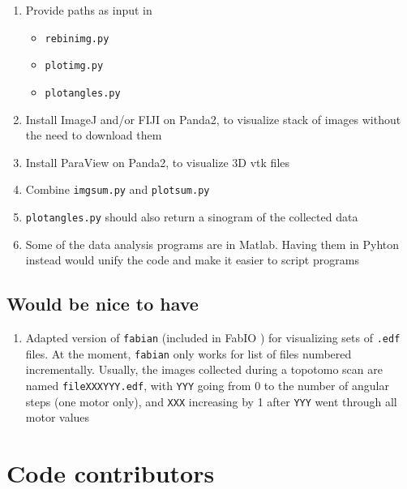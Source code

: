 \documentclass[11pt]{scrartcl}
\begin{document}
\begin{enumerate}
    \item Provide paths as input in
    \begin{itemize}
        \item {\texttt{rebin\textunderscore img.py}}
        \item {\texttt{plot\textunderscore img.py}}
        \item {\texttt{plot\textunderscore angles.py}}
    \end{itemize}
    \item Install ImageJ and/or {\footnotesize{FIJI}} on Panda2, to visualize stack of images without the need to download them
    \item Install ParaView on Panda2, to visualize {\footnotesize{3D}} vtk files
    \item Combine {\texttt{img\textunderscore sum.py}} and {\texttt{plot\textunderscore sum.py}}
    \item {\texttt{plot\textunderscore angles.py}} should also return a sinogram of the collected data
    \item Some of the data analysis programs are in Matlab. Having them in Pyhton instead would unify the code and make it easier to script programs
\end{enumerate}

\subsection{Would be nice to have}

\begin{enumerate}
    \item Adapted version of {\texttt{fabian}} (included in FabIO \cite{knudsen2013fabio}) for visualizing sets of {\texttt{.edf}} files. At the moment, {\texttt{fabian}} only works for list of files numbered incrementally. Usually, the images collected during a topotomo scan are named {\texttt{file\textunderscore XXX\textunderscore YYY.edf}}, with {\texttt{YYY}} going from 0 to the number of angular steps (one motor only), and {\texttt{XXX}} increasing by 1 after {\texttt{YYY}} went through all motor values
\end{enumerate}

\section{Code contributors}
\end{document}
